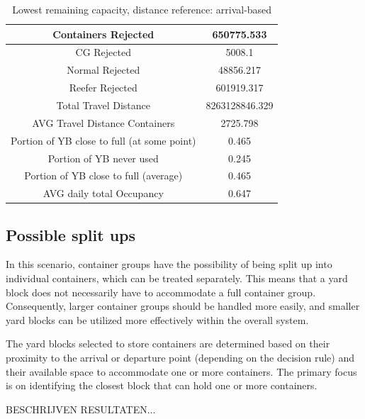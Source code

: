 \documentclass{article}
\begin{document}
\begin{table}[h]
    \centering
    \begin{tabular}{|c|c|}
        \hline
        Containers Rejected                         & 650775.533     \\ \hline
        CG Rejected                                 & 5008.1         \\ \hline
        Normal Rejected                             & 48856.217      \\ \hline
        Reefer Rejected                             & 601919.317     \\ \hline
        Total Travel Distance                       & 8263128846.329 \\ \hline
        AVG Travel Distance Containers              & 2725.798       \\ \hline
        Portion of YB close to full (at some point) & 0.465          \\ \hline
        Portion of YB never used                    & 0.245          \\ \hline
        Portion of YB close to full (average)       & 0.465          \\ \hline
        AVG daily total Occupancy                   & 0.647          \\ \hline
    \end{tabular}
    \caption{Lowest remaining capacity, distance reference: arrival-based}
\end{table}

\subsection{Possible split ups}

In this scenario, container groups have the possibility of being split up into
individual containers, which can be treated separately. This means that a yard
block does not necessarily have to accommodate a full container group.
Consequently, larger container groups should be handled more easily, and
smaller yard blocks can be utilized more effectively within the overall system.

The yard blocks selected to store containers are determined based on their
proximity to the arrival or departure point (depending on the decision rule)
and their available space to accommodate one or more containers. The primary
focus is on identifying the closest block that can hold one or more containers.

BESCHRIJVEN RESULTATEN...
\end{document}
